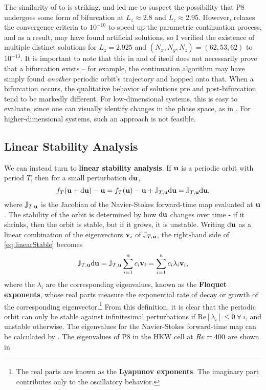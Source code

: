  The similarity of  to  is striking, and led me to suspect the possibility that P8 undergoes some form of bifurcation at $L_z \approx 2.8$ and $L_z \approx 2.95$. However,  relaxes the convergence criteria to $10^{-10}$ to speed up the parametric continuation process, and as a result, may have found artificial solutions, so I verified the existence of multiple distinct solutions for $L_z = 2.925$ and $(N_x,N_y,N_z) = (62,53,62)$ to $10^{-13}$. It is important to note that this in and of itself does not necessarily prove that a bifurcation exists -- for example, the continuation algorithm may have simply found \emph{another} periodic orbit's trajectory and hopped onto that. When a bifurcation occurs, the qualitative behavior of solutions pre and post-bifurcation tend to be markedly different. For low-dimensional systems, this is easy to evaluate, since one can visually identify changes in the phase space, as in . For higher-dimensional systems, such an approach is not feasible. 

\subsection{Linear Stability Analysis}\label{sec:LSA}

We can instead turn to {\bf linear stability analysis}. If $\mathbf{u}$ is a periodic orbit with period $T$, then for a small perturbation ${\bf \textrm{d}}\mathbf{u}$, 
\begin{equation}\label{eq:linearStable}
 f_T(\mathbf{u} + {\bf \textrm{d}}\mathbf{u}) - \mathbf{u} =  f_T(\mathbf{u}) - \mathbf{u} + \mathbb{J}_{T,\mathbf{u}}{\bf \textrm{d}}\mathbf{u} =  \mathbb{J}_{T,\mathbf{u}}{\bf \textrm{d}}\mathbf{u},
\end{equation} 
where $ \mathbb{J}_{T,\mathbf{u}}$ is the Jacobian of the Navier-Stokes forward-time map evaluated at $\mathbf{u}$. The stability of the orbit is determined by how  ${\bf \textrm{d}}\mathbf{u}$ changes over time - if it shrinks, then the orbit is stable, but if it grows, it is unstable. Writing  ${\bf \textrm{d}}\mathbf{u}$ as a linear combination of the eigenvectors $\mathbf{v}_i$ of  $ \mathbb{J}_{T,\mathbf{u}}$, the right-hand side of \eqref{eq:linearStable} becomes
\begin{equation}\label{eq:oneOrbit}
 \mathbb{J}_{T,\Vector{u}}{\bf \textrm{d}}\Vector{u} =  \mathbb{J}_{T,\Vector{u}}\sum{i = 1}{n}{c_i\Vector{v}_i} = \sum{i = 1}{n}{c_i\lambda_i\Vector{v}_i},
\end{equation}  
where the $\lambda_i$ are the corresponding eigenvalues, known as the {\bf Floquet exponents}, whose real parts measure the exponential rate of decay or growth of the corresponding eigenvector.\footnote{The real parts are known as the {\bf Lyapunov exponents}. The imaginary part contributes only to the oscillatory behavior.}   From this definition, it is clear that the periodic orbit can only be stable against infinitesimal perturbations if $\textrm{Re}[\lambda_i]  \leq 0~\forall~i$, and unstable otherwise. The eigenvalues for the Navier-Stokes forward-time map can be calculated by . The eigenvalues of P8 in the HKW cell at $Re=400$ are shown in 

